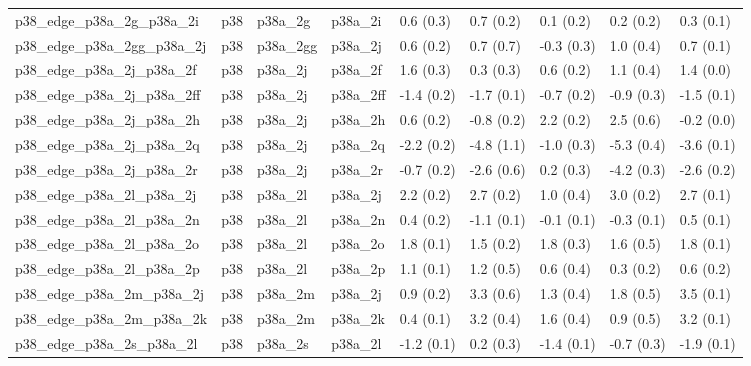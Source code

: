 \begin{tabular}{lllllllll}
p38\_edge\_p38a\_2g\_p38a\_2i         &       p38 &     p38a\_2g &     p38a\_2i &   0.6 (0.3) &         0.7 (0.2) &   0.1 (0.2) &   0.2 (0.2) &   0.3 (0.1) \\
p38\_edge\_p38a\_2gg\_p38a\_2j        &       p38 &    p38a\_2gg &     p38a\_2j &   0.6 (0.2) &         0.7 (0.7) &  -0.3 (0.3) &   1.0 (0.4) &   0.7 (0.1) \\
p38\_edge\_p38a\_2j\_p38a\_2f         &       p38 &     p38a\_2j &     p38a\_2f &   1.6 (0.3) &         0.3 (0.3) &   0.6 (0.2) &   1.1 (0.4) &   1.4 (0.0) \\
p38\_edge\_p38a\_2j\_p38a\_2ff        &       p38 &     p38a\_2j &    p38a\_2ff &  -1.4 (0.2) &        -1.7 (0.1) &  -0.7 (0.2) &  -0.9 (0.3) &  -1.5 (0.1) \\
p38\_edge\_p38a\_2j\_p38a\_2h         &       p38 &     p38a\_2j &     p38a\_2h &   0.6 (0.2) &        -0.8 (0.2) &   2.2 (0.2) &   2.5 (0.6) &  -0.2 (0.0) \\
p38\_edge\_p38a\_2j\_p38a\_2q         &       p38 &     p38a\_2j &     p38a\_2q &  -2.2 (0.2) &        -4.8 (1.1) &  -1.0 (0.3) &  -5.3 (0.4) &  -3.6 (0.1) \\
p38\_edge\_p38a\_2j\_p38a\_2r         &       p38 &     p38a\_2j &     p38a\_2r &  -0.7 (0.2) &        -2.6 (0.6) &   0.2 (0.3) &  -4.2 (0.3) &  -2.6 (0.2) \\
p38\_edge\_p38a\_2l\_p38a\_2j         &       p38 &     p38a\_2l &     p38a\_2j &   2.2 (0.2) &         2.7 (0.2) &   1.0 (0.4) &   3.0 (0.2) &   2.7 (0.1) \\
p38\_edge\_p38a\_2l\_p38a\_2n         &       p38 &     p38a\_2l &     p38a\_2n &   0.4 (0.2) &        -1.1 (0.1) &  -0.1 (0.1) &  -0.3 (0.1) &   0.5 (0.1) \\
p38\_edge\_p38a\_2l\_p38a\_2o         &       p38 &     p38a\_2l &     p38a\_2o &   1.8 (0.1) &         1.5 (0.2) &   1.8 (0.3) &   1.6 (0.5) &   1.8 (0.1) \\
p38\_edge\_p38a\_2l\_p38a\_2p         &       p38 &     p38a\_2l &     p38a\_2p &   1.1 (0.1) &         1.2 (0.5) &   0.6 (0.4) &   0.3 (0.2) &   0.6 (0.2) \\
p38\_edge\_p38a\_2m\_p38a\_2j         &       p38 &     p38a\_2m &     p38a\_2j &   0.9 (0.2) &         3.3 (0.6) &   1.3 (0.4) &   1.8 (0.5) &   3.5 (0.1) \\
p38\_edge\_p38a\_2m\_p38a\_2k         &       p38 &     p38a\_2m &     p38a\_2k &   0.4 (0.1) &         3.2 (0.4) &   1.6 (0.4) &   0.9 (0.5) &   3.2 (0.1) \\
p38\_edge\_p38a\_2s\_p38a\_2l         &       p38 &     p38a\_2s &     p38a\_2l &  -1.2 (0.1) &         0.2 (0.3) &  -1.4 (0.1) &  -0.7 (0.3) &  -1.9 (0.1) \\

\end{tabular}
